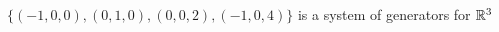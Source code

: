 \begin{example}
    $\{(-1, 0, 0), (0, 1, 0), (0, 0, 2), (-1, 0, 4)\}$ is a system of generators for $\mathbb{R}^3$
\end{example}